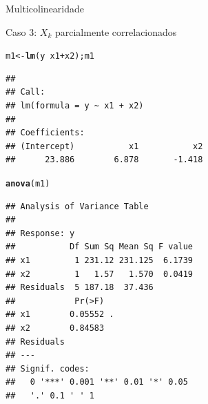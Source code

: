 \documentclass{beamer}\usepackage[]{graphicx}\usepackage[]{color}
\makeatletter
\newcommand{\hlopt}[1]{\textcolor[rgb]{0,0,0}{#1}}%
\newcommand{\hlstd}[1]{\textcolor[rgb]{0.345,0.345,0.345}{#1}}%
\newcommand{\hlkwb}[1]{\textcolor[rgb]{0.69,0.353,0.396}{#1}}%
\newcommand{\hlkwd}[1]{\textcolor[rgb]{0.737,0.353,0.396}{\textbf{#1}}}%
\newenvironment{kframe}{%
 \def\at@end@of@kframe{}%
 \ifinner\ifhmode%
  \def\at@end@of@kframe{\end{minipage}}%
  \begin{minipage}{\columnwidth}%
 \fi\fi%
 \def\FrameCommand##1{\hskip\@totalleftmargin \hskip-\fboxsep
 \colorbox{shadecolor}{##1}\hskip-\fboxsep
     \hskip-\linewidth \hskip-\@totalleftmargin \hskip\columnwidth}%
 \MakeFramed {\advance\hsize-\width
   \@totalleftmargin\z@ \linewidth\hsize
   \@setminipage}}%
 {\par\unskip\endMakeFramed%
 \at@end@of@kframe}
\newenvironment{knitrout}{}{} %
\renewenvironment{knitrout}{\setlength{\topsep}{0mm}}{}
\makeatother
\begin{document}
\begin{frame}[fragile]{Multicolinearidade}

Caso 3: $X_k$ parcialmente correlacionados
\vfill

\begin{knitrout}\tiny
{}\color{fgcolor}\begin{kframe}
\begin{alltt}
\hlstd{m1} \hlkwb{<-} \hlkwd{lm}\hlstd{(y} \hlopt{~} \hlstd{x1} \hlopt{+} \hlstd{x2); m1}
\end{alltt}
\begin{verbatim}
## 
## Call:
## lm(formula = y ~ x1 + x2)
## 
## Coefficients:
## (Intercept)           x1           x2  
##      23.886        6.878       -1.418
\end{verbatim}
\begin{alltt}
\hlkwd{anova}\hlstd{(m1)}
\end{alltt}
\begin{verbatim}
## Analysis of Variance Table
## 
## Response: y
##           Df Sum Sq Mean Sq F value
## x1         1 231.12 231.125  6.1739
## x2         1   1.57   1.570  0.0419
## Residuals  5 187.18  37.436        
##            Pr(>F)  
## x1        0.05552 .
## x2        0.84583  
## Residuals          
## ---
## Signif. codes:  
##   0 '***' 0.001 '**' 0.01 '*' 0.05
##   '.' 0.1 ' ' 1
\end{verbatim}
\end{kframe}
\end{knitrout}

\end{frame}
\end{document}
